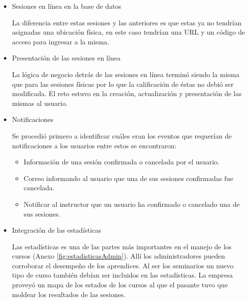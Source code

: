 \begin{itemize}

\item Sesiones en línea en la base de datos

La diferencia entre estas sesiones y las anteriores es que estas ya no tendrían asignadas una ubicación física, en este caso tendrían una \gls{URL} y un código de acceso para ingresar a la misma. 

\item Presentación de las sesiones en línea

La lógica de negocio detrás de las sesiones en línea terminó siendo la misma que para las sesiones físicas por lo que la calificación de éstas no debió ser modificada. El reto estuvo en la creación, actualización y presentación de las mismas al usuario.

\item Notificaciones

Se procedió primero a identificar cuáles eran los eventos que requerían de notificaciones a los usuarios entre estos se encontraron:

\begin{itemize}
	\item Información de una sesión confirmada o cancelada por el usuario.
	\item Correo informando al usuario que una de sus sesiones confirmadas fue cancelada.
	\item Notificar al instructor que un usuario ha confirmado o cancelado una de sus sesiones.
\end{itemize}

\item Integración de las estadísticas

Las estadísticas es una de las partes más importantes en el manejo de los cursos (Anexo \ref{fig:estadisticasAdmin}). Allí los administradores pueden corroborar el desempeño de los aprendices. Al ser los seminarios un nuevo tipo de curso también debían ser incluidos en las estadísticas. La empresa proveyó un mapa de los estados de los cursos al que el pasante tuvo que moldear los resultados de las sesiones. 

\end{itemize}


